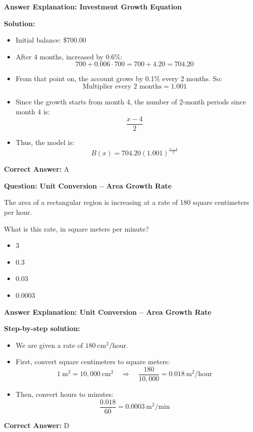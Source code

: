 \documentclass{beamer}
\begin{document}
\begin{frame}{\textbf{Answer Explanation: Investment Growth Equation}}

\textbf{Solution:}
\begin{itemize}
    \item Initial balance: \$700.00
    \item After 4 months, increased by 0.6\%: 
    \[
    700 + 0.006 \cdot 700 = 700 + 4.20 = 704.20
    \]
    \item From that point on, the account grows by 0.1\% every 2 months. So:
    \[
    \text{Multiplier every 2 months} = 1.001
    \]
    \item Since the growth starts from month 4, the number of 2-month periods since month 4 is:
    \[
    \frac{x - 4}{2}
    \]
    \item Thus, the model is:
    \[
    B(x) = 704.20(1.001)^{\frac{x-4}{2}}
    \]
\end{itemize}

\textbf{Correct Answer:} \( \boxed{\text{A}} \)

\end{frame}


\begin{frame}{\textbf{Question: Unit Conversion – Area Growth Rate}}

The area of a rectangular region is increasing at a rate of 180 square centimeters per hour.  

What is this rate, in square meters per minute?

\begin{itemize}
    \item[A.] 3
    \item[B.] 0.3
    \item[C.] 0.03
    \item[D.] 0.0003
\end{itemize}

\end{frame}
\begin{frame}{\textbf{Answer Explanation: Unit Conversion – Area Growth Rate}}

\textbf{Step-by-step solution:}

\begin{itemize}
    \item We are given a rate of \( 180 \ \text{cm}^2/\text{hour} \).
    \item First, convert square centimeters to square meters:
    \[
    1 \ \text{m}^2 = 10{,}000 \ \text{cm}^2 \quad \Rightarrow \quad \frac{180}{10{,}000} = 0.018 \ \text{m}^2/\text{hour}
    \]
    \item Then, convert hours to minutes:
    \[
    \frac{0.018}{60} = 0.0003 \ \text{m}^2/\text{min}
    \]
\end{itemize}

\textbf{Correct Answer:} \( \boxed{\text{D}} \)

\end{frame}
\end{document}
